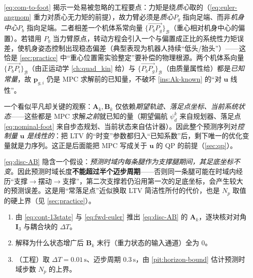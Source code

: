 \begin{insight}\label{ins:com-offset}
\cref{eq:com-to-foot} 揭示一处易被忽略的工程要点：力矩是绕\emph{质心}取的（\cref{eq:euler-angmom} 重力对质心无力矩的前提），故力臂必须是\emph{质心}$P_g$ 指向足端、而非\emph{机身中心}$P_b$ 指向足端。二者相差一个机体系常向量 $\{\overrightarrow{P_bP_g}\}_{\mathcal{B}}$（重心相对机身中心的偏置）。若错用 $P_b$ 当力臂原点，转动方程会引入一个与偏置成正比的系统性力矩误差，使机身姿态控制出现稳态偏差（典型表现为机器人持续“低头/抬头”）——这恰是 \cref{sec:practice} 中“重心位置需实验整定”要补偿的物理根源。两个机体系向量 $\{\overrightarrow{P_bP_i}\}_{\mathcal{B}}$（由正运动学 \cref{ch:quad_kin} 给）与 $\{\overrightarrow{P_bP_g}\}_{\mathcal{B}}$（由质量属性给）都是\emph{已知常量}，故 $\boldsymbol{p}_{g,i}$ 仍是 MPC 求解前的已知量，不破坏 \cref{ins:Ak-known} 的“对 $\boldsymbol{u}$ 线性”。
\end{insight}

\begin{insight}\label{ins:Ak-known}
一个看似平凡却关键的观察：$\mathbf{A}_k,\mathbf{B}_k$ 仅依赖\emph{期望轨迹、落足点坐标、当前系统状态}——这些都是 MPC 求解\emph{之前}就已知的量（期望偏航 $\psi_d^k$ 来自规划器、落足点 \cref{eq:nominal-foot} 来自步态规划、当前状态来自估计器）。因此整个预测序列对\emph{控制量 $\boldsymbol{u}$ 是线性的}：把 LTV 的“时变”参数都归入“已知系数”后，剩下唯一的优化变量就是力序列。这正是后面能把 MPC 写成关于 $\boldsymbol{u}$ 的 QP 的前提（\cref{sec:qp}）。
\end{insight}

\begin{pitfall}[陷阱：预测时域不能超过半个迈步周期]\label{pit:horizon-bound}
\cref{eq:disc-AB} 隐含一个假设：\emph{预测时域内每条腿作为支撑腿期间，其足底坐标不变}。因此预测时域长度\textbf{不能超过半个迈步周期}\cite{yu2021quadruped}——否则同一条腿可能在时域内经历“支撑$\to$摆动$\to$支撑”，第二次支撑若仍沿用第一次的足底坐标，会产生较大的预测误差。这是用“常落足点”近似换取 LTV 简洁性所付的代价，也是 $N_p$ 取值的硬上界（见 \cref{sec:practice}）。
\end{pitfall}

\begin{practice}
\begin{enumerate}
  \item 由 \cref{eq:cont-13state} 与 \cref{eq:fwd-euler} 推出 \cref{eq:disc-AB} 的 $\mathbf{A}_k$，逐块核对对角 $\mathbf{I}_3$ 与耦合块的 $\Delta T$。
  \item 解释为什么状态增广后 $\mathbf{B}_k$ 末行（重力状态的输入通道）全为 $0$。
  \item （工程）取 $\Delta T=0.01\,\mathrm{s}$、迈步周期 $0.3\,\mathrm{s}$，由 \cref{pit:horizon-bound} 估计预测时域步数 $N_p$ 的上界。
\end{enumerate}
\end{practice}

